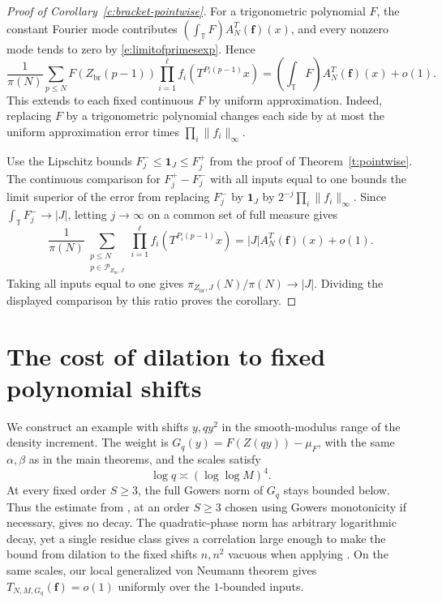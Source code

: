 \documentclass[12pt]{amsart}
\newcommand{\1}{\mathbf 1}
\theoremstyle{definition}
\begin{document}
\begin{proof}[Proof of Corollary~\ref{c:bracket-pointwise}]
For a trigonometric polynomial $F$, the constant Fourier mode
contributes $(\int_{\mathbb T}F)A_N^T(\mathbf f)(x)$, and every
nonzero mode tends to zero by \eqref{e:limitofprimesexp}. Hence
\[
 \frac1{\pi(N)}\sum_{p\leq N}F(Z_{\mathrm{br}}(p-1))
 \prod_{i=1}^{\ell}f_i(T^{P_i(p-1)}x)
 =\left(\int_{\mathbb T}F\right)A_N^T(\mathbf f)(x)+o(1).
\]
This extends to each fixed continuous $F$ by uniform approximation.
Indeed, replacing $F$ by a trigonometric polynomial changes each
side by at most the uniform approximation error times
$\prod_i\|f_i\|_\infty$.

Use the Lipschitz bounds $F_j^-\leq\mathbf1_J\leq F_j^+$ from the
proof of Theorem~\ref{t:pointwise}. The continuous comparison for
$F_j^+-F_j^-$ with all inputs equal to one bounds the limit superior
of the error from replacing $F_j^-$ by $\mathbf1_J$ by
$2^{-j}\prod_i\|f_i\|_\infty$. Since $\int_{\mathbb T}F_j^-\to |J|$,
letting $j\to\infty$ on a common set of full measure gives
\[
 \frac1{\pi(N)}
 \sum_{\substack{p\leq N\\p\in\mathcal P_{Z_{\mathrm{br}},J}}}
 \prod_{i=1}^{\ell}f_i(T^{P_i(p-1)}x)
 = |J|A_N^T(\mathbf f)(x)+o(1).
\]
Taking all inputs equal to one gives
$\pi_{Z_{\mathrm{br}},J}(N)/\pi(N)\to |J|$. Dividing the displayed
comparison by this ratio proves the corollary.
\end{proof}

\appendix

\section{The cost of dilation to fixed polynomial shifts}
\label{s:why-Cq}

We construct an example with shifts $y,qy^2$ in the smooth-modulus
range of the density increment. The weight is
$G_q(y)=F(Z(qy))-\mu_F$, with the same $\alpha,\beta$ as in the
main theorems, and the scales satisfy
$$\log q\asymp(\log\log M)^4.$$
At every fixed order $S\geq3$, the full Gowers norm of $G_q$
stays bounded below. Thus the estimate from
\cite[Proposition~3.3]{KMTT}, at an order $S\geq3$ chosen using
Gowers monotonicity if necessary, gives no decay.
The quadratic-phase norm has arbitrary logarithmic decay, yet
a single residue class gives a correlation large enough to make
the bound from dilation to the fixed shifts $n,n^2$ vacuous
when applying \cite[Theorem~4.1]{Teravainen}. On the same scales,
our local generalized von Neumann theorem gives
$T_{N,M,G_q}(\mathbf f)=o(1)$ uniformly over the $1$-bounded
inputs.
\end{document}
